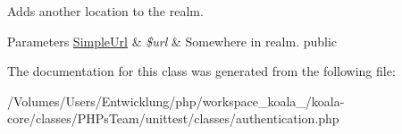 \label{class_simple_realm_a9337bb639d1bf37b5dee82ca86ab5a8e}
Adds another location to the realm. 
\begin{DoxyParams}[1]{Parameters}
\hyperlink{class_simple_url}{SimpleUrl} & {\em \$url} & Somewhere in realm.  public \\
\hline
\end{DoxyParams}


The documentation for this class was generated from the following file:\begin{DoxyCompactItemize}
\item 
/Volumes/Users/Entwicklung/php/workspace\_\-koala\_/koala-\/core/classes/PHPsTeam/unittest/classes/authentication.php\end{DoxyCompactItemize}

